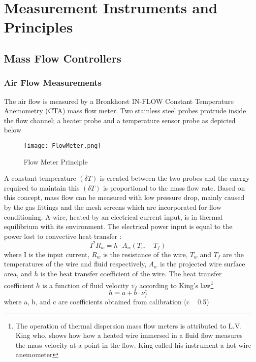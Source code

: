 \chapter{Measurement Instruments and Principles}\label{ch:AppA}
\section{Mass Flow Controllers}
\subsection{Air Flow Measurements}
The air flow is measured by a Bronkhorst IN-FLOW Constant Temperature Anemometry (CTA)  mass flow meter. Two stainless steel probes protrude inside the flow channel;  a heater probe and a temperature sensor probe as depicted below
 \begin{figure}[h!]
    \centering
        \texttt{[image: FlowMeter.png]}
        \caption{Flow Meter Principle}
    \label{f:FlowMeter}
\end{figure}
 A constant temperature $(\delta T)$ is created between the two probes and the energy required to maintain this $(\delta T)$ is proportional to the mass flow rate.  Based on this concept, mass flow can be measured with low pressure drop, mainly caused by the gas fittings and the mesh screens which are incorporated for flow conditioning.
 A wire, heated by an electrical current input, is in thermal equilibrium with its environment. The electrical power input is equal to the power lost to convective heat transfer :
\begin{equation}
I^2R_w = h\cdot A_w\left ( T_w - T_f \right )
\label{Ch_5_01}
\end{equation}
where I is the input current, $R_w$ is the resistance of the wire, $T_w$ and $T_f$ are the temperatures of the wire and fluid respectively, $A_w$ is the projected wire surface area, and $h$ is the heat transfer coefficient of the wire. The heat transfer coefficient $h$ is a function of fluid velocity $v_f$ according to King's law\footnote{The operation of thermal dispersion mass flow meters is attributed to L.V. King who, shows how how a heated wire immersed in a fluid flow measures the mass velocity at a point in the flow. King called his instrument a hot-wire anemometer}
\begin{equation}
h = a + b\cdot \nu^c_f
\label{Ch_5_02}
\end{equation}
where a, b, and c are coefficients obtained from calibration (c ~ 0.5)
